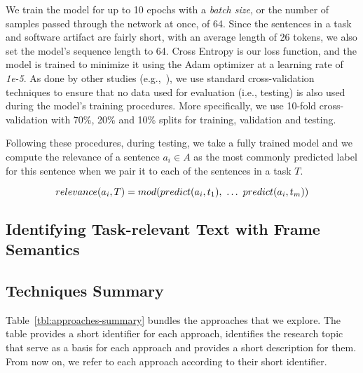 We train the model for up to 10 epochs with a \textit{batch size}, or the number of samples passed through the network at once, of 64. Since the sentences in a task and software artifact are fairly short, with an average length of 26 tokens, we also set the model's sequence length to 64. Cross Entropy is our loss function, and the model is trained to minimize it using the Adam optimizer at a learning rate of \textit{1e-5}.
As done by other studies (e.g.,~\cite{Chaparro2017, fucci2019, Petrosyan2015}), we use standard cross-validation techniques to ensure  that no data used for evaluation (i.e., testing) is also used
during the model's training procedures. More specifically, we use 10-fold cross-validation with 70\%, 20\% and 10\% splits for training, validation and testing. 




Following these procedures, during testing, we take a fully trained model and we compute the relevance of a sentence $a_i \in A$ as the most commonly predicted label for this sentence when we pair it to each of the sentences in a task $T$.

\begin{equation}
    relevance(a_i, T) = mod(predict(a_i, t_1), ~\dots~ predict(a_i, t_m)) \\
\end{equation}





\subsection{Identifying Task-relevant Text with Frame Semantics}













\subsection{Techniques Summary}


Table~\ref{tbl:approaches-summary} bundles the approaches that we explore.
The table provides a short identifier for each approach, identifies the research topic that serve as a basis for each approach and provides a short description for them. From now on, we refer to each approach according to their short identifier.


